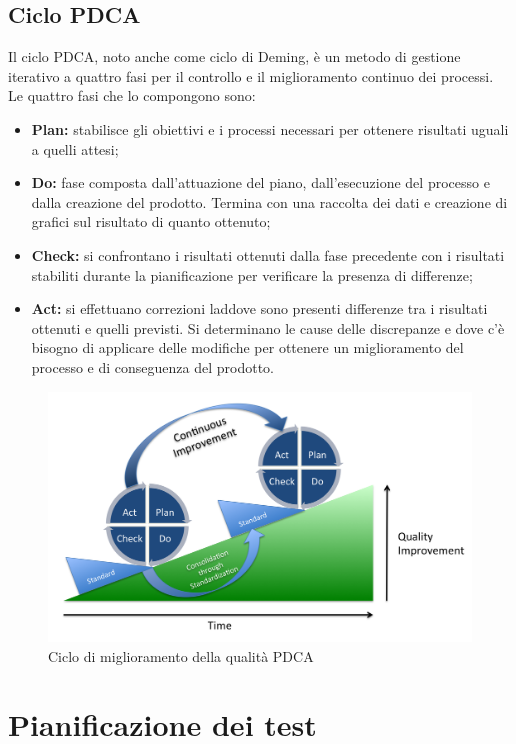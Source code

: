 	\subsection{Ciclo PDCA}
	Il ciclo PDCA, noto anche come ciclo di Deming, è un metodo di gestione iterativo a quattro fasi per il controllo e il miglioramento continuo dei processi.\\
	Le quattro fasi che lo compongono sono:
			\begin{itemize}
				\item \textbf{Plan:} stabilisce gli obiettivi e i processi necessari per ottenere risultati uguali a quelli attesi;
				\item \textbf{Do:} fase composta dall'attuazione del piano, dall'esecuzione del processo e dalla creazione del prodotto. Termina con una raccolta dei dati e creazione di grafici sul risultato di quanto ottenuto;
				\item \textbf{Check:} si confrontano i risultati ottenuti dalla fase precedente con i risultati stabiliti durante la pianificazione per verificare la presenza di differenze;
				\item \textbf{Act:} si effettuano correzioni laddove sono presenti differenze tra i risultati ottenuti e quelli previsti. Si determinano le cause delle discrepanze e dove c'è bisogno di applicare delle modifiche per ottenere un miglioramento del processo e di conseguenza del prodotto.
			\end{itemize}
			\begin{figure}[h]
				\centering
				\includegraphics[width=120mm]{images/pdca.png}
				\caption{Ciclo di miglioramento della qualità PDCA}
				\label{fig:pdca}
			\end{figure}
		
\pagebreak

\section{Pianificazione dei test}
